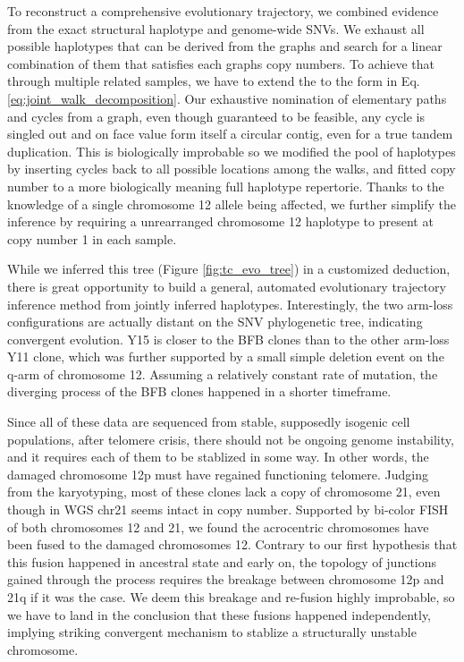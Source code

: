 \documentclass[phd,tocprelim]{cornell}
\begin{document}
To reconstruct a comprehensive evolutionary trajectory, we combined evidence from the exact structural haplotype and genome-wide SNVs. We exhaust all possible haplotypes that can be derived from the graphs and search for a linear combination of them that satisfies each graphs copy numbers. To achieve that through multiple related samples, we have to extend the  to the form in Eq. \ref{eq:joint_walk_decomposition}. Our exhaustive nomination of elementary paths and cycles from a graph, even though guaranteed to be feasible, any cycle is singled out and on face value form itself a circular contig, even for a true tandem duplication. This is biologically improbable so we modified the pool of haplotypes by inserting cycles back to all possible locations among the walks, and fitted copy number to a more biologically meaning full haplotype repertorie. Thanks to the knowledge of a single chromosome 12 allele being affected, we further simplify the inference by requiring a unrearranged chromosome 12 haplotype to present at copy number 1 in each sample.

While we inferred this tree (Figure \ref{fig:tc_evo_tree}) in a customized deduction, there is great opportunity to build a general, automated evolutionary trajectory inference method from jointly inferred haplotypes. Interestingly, the two arm-loss configurations are actually distant on the SNV phylogenetic tree, indicating convergent evolution. Y15 is closer to the BFB clones than to the other arm-loss Y11 clone, which was further supported by a small simple deletion event on the q-arm of chromosome 12. Assuming a relatively constant rate of mutation, the diverging process of the BFB clones happened in a shorter timeframe. 

Since all of these data are sequenced from stable, supposedly isogenic cell populations, after telomere crisis, there should not be ongoing genome instability, and it requires each of them to be stablized in some way. In other words, the damaged chromosome 12p must have regained functioning telomere. Judging from the karyotyping, most of these clones lack a copy of chromosome 21, even though in WGS chr21 seems intact in copy number. Supported by bi-color FISH of both chromosomes 12 and 21, we found the acrocentric chromosomes have been fused to the damaged chromosomes 12. Contrary to our first hypothesis that this fusion happened in ancestral state and early on, the topology of junctions gained through the process requires the breakage between chromosome 12p and 21q if it was the case. We deem this breakage and re-fusion highly improbable, so we have to land in the conclusion that these fusions happened independently, implying striking convergent mechanism to stablize a structurally unstable chromosome. 
\end{document}
